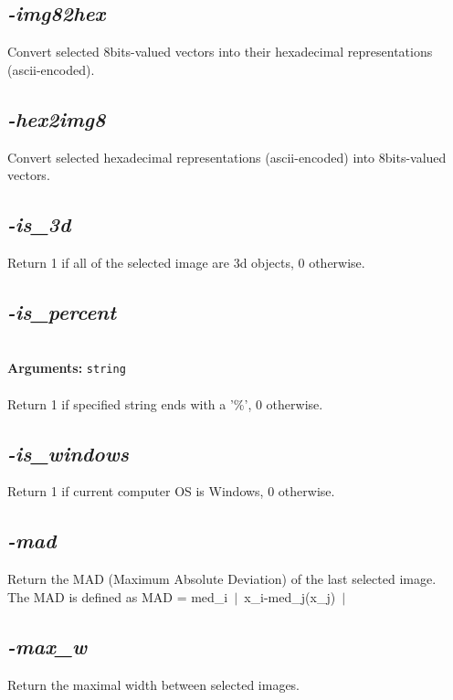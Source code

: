 \documentclass[a4paper,11pt,twoside]{book}
\begin{document}
\subsection{\emph{-img82hex} }\vspace*{-0.5em}
Convert selected 8bits-valued vectors into their hexadecimal representations (ascii-encoded).


\subsection{\emph{-hex2img8} }\vspace*{-0.5em}
Convert selected hexadecimal representations (ascii-encoded) into 8bits-valued vectors.


\subsection{\emph{-is\_3d} }\vspace*{-0.5em}
Return 1 if all of the selected image are 3d objects, 0 otherwise.


\subsection{\emph{-is\_percent} }\vspace*{-0.5em}
~\\\textbf{Arguments: } 
{\small \texttt{string}}\\~\\
Return 1 if specified string ends with a '\%', 0 otherwise.


\subsection{\emph{-is\_windows} }\vspace*{-0.5em}
Return 1 if current computer OS is Windows, 0 otherwise.


\subsection{\emph{-mad} }\vspace*{-0.5em}
Return the MAD (Maximum Absolute Deviation) of the last selected image.
~\\The MAD is defined as MAD = med\_i~$|$~x\_i-med\_j(x\_j)~$|$~


\subsection{\emph{-max\_w} }\vspace*{-0.5em}
Return the maximal width between selected images.
\end{document}
